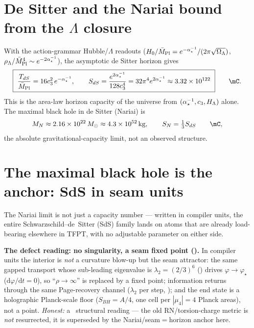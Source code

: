 \section{De Sitter and the Nariai bound from the $\Lambda$ closure}
With the action-grammar Hubble/$\Lambda$ readouts ($H_0/\bar M_{\mathrm{Pl}}=e^{-\alpha^{-1}_\star}/(2\pi\sqrt{\Omega_\Lambda})$,
$\rho_\Lambda/\bar M_{\mathrm{Pl}}^4\sim e^{-2\alpha^{-1}_\star}$), the asymptotic de Sitter horizon gives
\[
  \boxed{\ \frac{T_{dS}}{\Mbar}=16\cthree^2\,e^{-\ainv},\qquad
  S_{dS}=\frac{e^{2\ainv}}{128\cthree^4}=32\pi^4 e^{2\ainv}\approx3.32\times10^{122}\ }\qquad\mC.
\]
This is the area-law horizon capacity of the universe from $(\alpha^{-1}_\star,c_3,H_\Lambda)$ alone. The maximal
black hole in de Sitter (Nariai) is
\[
  M_N\approx2.16\times10^{22}\,M_\odot\approx4.3\times10^{52}\,\mathrm{kg},\qquad S_N=\tfrac13 S_{dS}\qquad\mC,
\]
the absolute gravitational-capacity limit, not an observed structure.

\section{The maximal black hole is the anchor: SdS in seam units}
The Nariai limit is not just a capacity number --- written in compiler units, the entire
Schwarzschild--de~Sitter (SdS) family lands on atoms that are already load-bearing elsewhere in TFPT,
with no adjustable parameter on either side. \mE\ 

\par\smallskip\noindent\textbf{The defect reading: no singularity, a seam fixed point
().} In compiler units the interior is \emph{not} a curvature blow-up but
the seam attractor: the same gapped transport whose sub-leading eigenvalue is $\lambda_2=(2/3)^6$
() drives $\varphi\to\varphi_\star$ ($\mathrm d\varphi/\mathrm dt=0$), so
``$\rho\to\infty$'' is replaced by a fixed point; information returns through the same Page-recovery channel
($\lambda_2$ per step, ); and the end state is a holographic
Planck-scale floor ($S_{BH}=A/4$, one cell per $|\mu_4|=4$ Planck areas), not a point. \emph{Honest:} a \mC\
structural reading --- the old RN/torsion-charge metric is \emph{not} resurrected, it is superseded by the
Nariai/seam$=$horizon anchor here.

